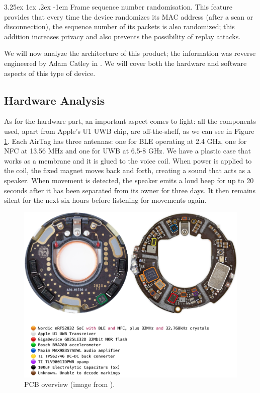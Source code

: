 \documentclass[english]{article}
\makeatletter
\renewcommand\paragraph{\@startsection{paragraph}{5}{\z@}%
  {3.25ex \@plus1ex \@minus.2ex}%
  {-1em}%
  {\normalfont\normalsize\bfseries}}
\makeatother
\begin{document}
\paragraph{Frame sequence number randomisation.}
This feature provides that every time the device randomizes its MAC address (after a scan or disconnection), the sequence number of its packets is also randomized; this addition increases privacy and also prevents the possibility of replay attacks.

We will now analyze the architecture of this product; the information was reverse engineered by Adam Catley in \cite{reverse}. We will cover both the hardware and software aspects of this type of device.

\subsection{Hardware Analysis}\label{hw}
As for the hardware part, an important aspect comes to light: all the components used, apart from Apple's U1 UWB chip, are off-the-shelf, as we can see in Figure \ref{img:pcb}.
Each AirTag has three antennas: one for BLE operating at 2.4 GHz, one for NFC at 13.56 MHz and one for UWB at 6.5-8 GHz.
We have a plastic case that works as a membrane and it is glued to the voice coil. When power is applied to the coil, the fixed magnet moves back and forth, creating a sound that acts as a speaker.
When movement is detected, the speaker emits a loud beep for up to 20 seconds after it has been separated from its owner for three days. It then remains silent for the next six hours before listening for movements again.
\begin{figure}[ht]
	\centering
	\includegraphics[width=\textwidth]{images/pcb.png}
	\caption{PCB overview (image from \cite{reverse}). }
	\label{img:pcb}
\end{figure}
\end{document}
